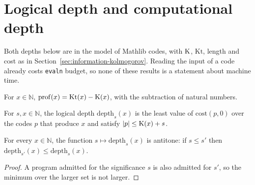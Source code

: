 \section{Logical depth and computational depth}
\label{sec:information-depth}

Both depths below are in the model of Mathlib codes, with $\mathrm{K}$, $\mathrm{Kt}$, length and cost
as in Section~\ref{sec:information-kolmogorov}. Reading the input of a code already costs
\texttt{evaln} budget, so none of these results is a statement about machine time.

\begin{definition}
  \label{def:information-prof}
  \leanok
  For $x \in \mathbb{N}$, $\mathrm{prof}(x) = \mathrm{Kt}(x) - \mathrm{K}(x)$, with the subtraction of
  natural numbers.
\end{definition}

\begin{definition}
  \label{def:information-logical-depth}
  \leanok
  For $s, x \in \mathbb{N}$, the logical depth $\mathrm{depth}_s(x)$ is the least value of
  $\mathrm{cost}(p, 0)$ over the codes $p$ that produce $x$ and satisfy $|p| \le \mathrm{K}(x) + s$.
\end{definition}

\begin{theorem}
  \label{thm:information-depth-antitone}
  \leanok
  For every $x \in \mathbb{N}$, the function $s \mapsto \mathrm{depth}_s(x)$ is antitone: if
  $s \le s'$ then $\mathrm{depth}_{s'}(x) \le \mathrm{depth}_s(x)$.
\end{theorem}

\begin{proof}
  \leanok
  A program admitted for the significance $s$ is also admitted for $s'$, so the minimum over the
  larger set is not larger.
\end{proof}

